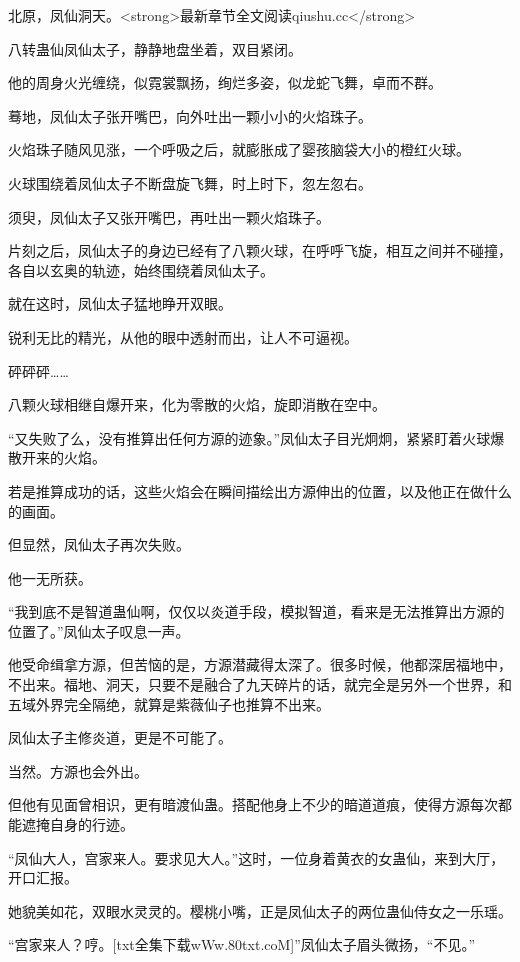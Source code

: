 
\begin{this_body}

北原，凤仙洞天。<strong>最新章节全文阅读qiushu.cc</strong>

八转蛊仙凤仙太子，静静地盘坐着，双目紧闭。

他的周身火光缠绕，似霓裳飘扬，绚烂多姿，似龙蛇飞舞，卓而不群。

蓦地，凤仙太子张开嘴巴，向外吐出一颗小小的火焰珠子。

火焰珠子随风见涨，一个呼吸之后，就膨胀成了婴孩脑袋大小的橙红火球。

火球围绕着凤仙太子不断盘旋飞舞，时上时下，忽左忽右。

须臾，凤仙太子又张开嘴巴，再吐出一颗火焰珠子。

片刻之后，凤仙太子的身边已经有了八颗火球，在呼呼飞旋，相互之间并不碰撞，各自以玄奥的轨迹，始终围绕着凤仙太子。

就在这时，凤仙太子猛地睁开双眼。

锐利无比的精光，从他的眼中透射而出，让人不可逼视。

砰砰砰……

八颗火球相继自爆开来，化为零散的火焰，旋即消散在空中。

“又失败了么，没有推算出任何方源的迹象。”凤仙太子目光炯炯，紧紧盯着火球爆散开来的火焰。

若是推算成功的话，这些火焰会在瞬间描绘出方源伸出的位置，以及他正在做什么的画面。

但显然，凤仙太子再次失败。

他一无所获。

“我到底不是智道蛊仙啊，仅仅以炎道手段，模拟智道，看来是无法推算出方源的位置了。”凤仙太子叹息一声。

他受命缉拿方源，但苦恼的是，方源潜藏得太深了。很多时候，他都深居福地中，不出来。福地、洞天，只要不是融合了九天碎片的话，就完全是另外一个世界，和五域外界完全隔绝，就算是紫薇仙子也推算不出来。

凤仙太子主修炎道，更是不可能了。

当然。方源也会外出。

但他有见面曾相识，更有暗渡仙蛊。搭配他身上不少的暗道道痕，使得方源每次都能遮掩自身的行迹。

“凤仙大人，宫家来人。要求见大人。”这时，一位身着黄衣的女蛊仙，来到大厅，开口汇报。

她貌美如花，双眼水灵灵的。樱桃小嘴，正是凤仙太子的两位蛊仙侍女之一乐瑶。

“宫家来人？哼。[txt全集下载wWw.80txt.coM]”凤仙太子眉头微扬，“不见。”


\end{this_body}
